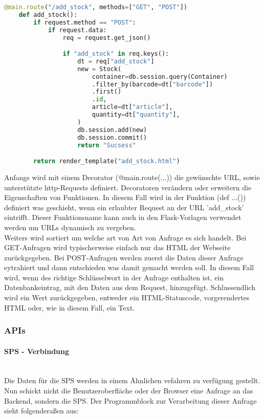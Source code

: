 \begin{lstlisting}[language=Python]
    @main.route("/add_stock", methods=["GET", "POST"])
    def add_stock():
        if request.method == "POST":
            if request.data:
                req = request.get_json()

                if "add_stock" in req.keys():
                    dt = req["add_stock"]
                    new = Stock(
                        container=db.session.query(Container)
                        .filter_by(barcode=dt["barcode"])
                        .first()
                        .id,
                        article=dt["article"],
                        quantity=dt["quantity"],
                    )
                    db.session.add(new)
                    db.session.commit()
                    return "Sucsess"

        return render_template("add_stock.html")
\end{lstlisting}  

Anfangs wird mit einem Decorator (@main.route(...)) die gewünschte URL, sowie unterstützte http-Requests definiert. Decoratoren verändern oder erweitern die Eigenschaften von Funktionen. In diesem Fall wird in der Funktion (def ...()) definiert was geschieht, wenn ein erlaubter Request an der URL 'add\_stock' eintrifft. Dieser Funktionsname kann auch in den Flask-Vorlagen verwendet werden um URLs dynamisch zu vergeben.\\
Weiters wird sortiert um welche art von Art von Anfrage es sich handelt. Bei GET-Anfragen wird typischerweise einfach nur das HTML der Webseite zurückgegeben. Bei POST-Anfragen werden zuerst die Daten dieser Anfrage eytrahiert und dann entschieden was damit gemacht werden soll. In diesem Fall wird, wenn des richtige Schlüsselwort in der Anfrage enthalten ist, ein Datenbankeintrag, mit den Daten aus dem Request, hinzugefügt. Schlussendlich wird ein Wert zurückgegeben, entweder ein HTML-Statuscode, vorgerendertes HTML oder, wie in diesem Fall, ein Text.

\subsubsection{APIs}

\paragraph{SPS - Verbindung}\mbox{}\\
Die Daten für die SPS werden in einem Ähnlichen vefahren zu verfügung gestellt. Nun schickt nicht die Benutzeroberfläche oder der Browser eine Anfrage an das Backend, sondern die SPS. Der Programmblock zur Verarbeitung dieser Anfrage sieht folgenderaßen aus:

